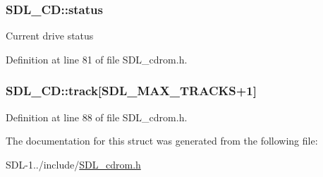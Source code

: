 \hypertarget{struct_s_d_l___c_d_afaab8559e9b75bbf501b31b5f5f01a9b}{}
\subsubsection[{status}]{ S\+D\+L\+\_\+\+C\+D\+::status}\label{struct_s_d_l___c_d_afaab8559e9b75bbf501b31b5f5f01a9b}
Current drive status 

Definition at line 81 of file S\+D\+L\+\_\+cdrom.\+h.

\hypertarget{struct_s_d_l___c_d_ad9dd6d42b8c1677e83926aa9e9031ecc}{}
\subsubsection[{track}]{ S\+D\+L\+\_\+\+C\+D\+::track\mbox{[}{\bf S\+D\+L\+\_\+\+M\+A\+X\+\_\+\+T\+R\+A\+C\+K\+S}+1\mbox{]}}\label{struct_s_d_l___c_d_ad9dd6d42b8c1677e83926aa9e9031ecc}


Definition at line 88 of file S\+D\+L\+\_\+cdrom.\+h.



The documentation for this struct was generated from the following file\+:\begin{DoxyCompactItemize}
\item 
S\+D\+L-\/1../include/\hyperlink{_s_d_l__cdrom_8h}{S\+D\+L\+\_\+cdrom.\+h}\end{DoxyCompactItemize}
